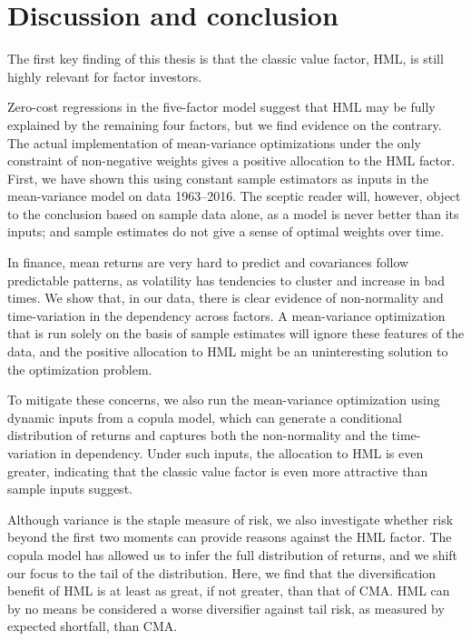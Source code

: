 
\section{Discussion and conclusion} %
\label{sec:discussion_conclusion}

The first key finding of this thesis is that the classic value factor, HML, is still highly relevant for factor investors. 

Zero-cost regressions in the five-factor model suggest that HML may be fully explained by the remaining four factors, but we find evidence on the contrary. The actual implementation of mean-variance optimizations under the only constraint of non-negative weights gives a positive allocation to the HML factor. First, we have shown this using constant sample estimators as inputs in the mean-variance model on data 1963--2016. The sceptic reader will, however, object to the conclusion based on sample data alone, as a model is never better than its inputs; and sample estimates do not give a sense of optimal weights over time.

In finance, mean returns are very hard to predict and covariances follow predictable patterns, as volatility has tendencies to cluster and increase in bad times. We show that, in our data, there is clear evidence of non-normality and time-variation in the dependency across factors. A mean-variance optimization that is run solely on the basis of sample estimates will ignore these features of the data, and the positive allocation to HML might be an uninteresting solution to the optimization problem.

To mitigate these concerns, we also run the mean-variance optimization using dynamic inputs from a copula model, which can generate a conditional distribution of returns and captures both the non-normality and the time-variation in dependency. Under such inputs, the allocation to HML is even greater, indicating that the classic value factor is even more attractive than sample inputs suggest.

Although variance is the staple measure of risk, we also investigate whether risk beyond the first two moments can provide reasons against the HML factor. The copula model has allowed us to infer the full distribution of returns, and we shift our focus to the tail of the distribution. Here, we find that the diversification benefit of HML is at least as great, if not greater, than that of CMA. HML can by no means be considered a worse diversifier against tail risk, as measured by expected shortfall, than CMA.

